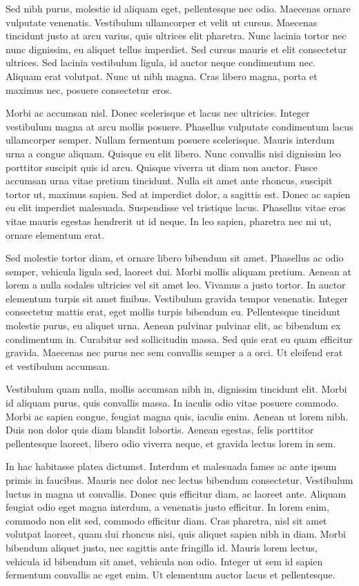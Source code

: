 Sed nibh purus, molestie id aliquam eget, pellentesque nec odio. Maecenas ornare vulputate venenatis. Vestibulum ullamcorper et velit ut cursus. Maecenas tincidunt justo at arcu varius, quis ultrices elit pharetra. Nunc lacinia tortor nec nunc dignissim, eu aliquet tellus imperdiet. Sed cursus mauris et elit consectetur ultrices. Sed lacinia vestibulum ligula, id auctor neque condimentum nec. Aliquam erat volutpat. Nunc ut nibh magna. Cras libero magna, porta et maximus nec, posuere consectetur eros.

Morbi ac accumsan nisl. Donec scelerisque et lacus nec ultricies. Integer vestibulum magna at arcu mollis posuere. Phasellus vulputate condimentum lacus ullamcorper semper. Nullam fermentum posuere scelerisque. Mauris interdum urna a congue aliquam. Quisque eu elit libero. Nunc convallis nisi dignissim leo porttitor suscipit quis id arcu. Quisque viverra ut diam non auctor. Fusce accumsan urna vitae pretium tincidunt. Nulla sit amet ante rhoncus, suscipit tortor ut, maximus sapien. Sed at imperdiet dolor, a sagittis est. Donec ac sapien eu elit imperdiet malesuada. Suspendisse vel tristique lacus. Phasellus vitae eros vitae mauris egestas hendrerit ut id neque. In leo sapien, pharetra nec mi ut, ornare elementum erat.

Sed molestie tortor diam, et ornare libero bibendum sit amet. Phasellus ac odio semper, vehicula ligula sed, laoreet dui. Morbi mollis aliquam pretium. Aenean at lorem a nulla sodales ultricies vel sit amet leo. Vivamus a justo tortor. In auctor elementum turpis sit amet finibus. Vestibulum gravida tempor venenatis. Integer consectetur mattis erat, eget mollis turpis bibendum eu. Pellentesque tincidunt molestie purus, eu aliquet urna. Aenean pulvinar pulvinar elit, ac bibendum ex condimentum in. Curabitur sed sollicitudin massa. Sed quis erat eu quam efficitur gravida. Maecenas nec purus nec sem convallis semper a a orci. Ut eleifend erat et vestibulum accumsan.

Vestibulum quam nulla, mollis accumsan nibh in, dignissim tincidunt elit. Morbi id aliquam purus, quis convallis massa. In iaculis odio vitae posuere commodo. Morbi ac sapien congue, feugiat magna quis, iaculis enim. Aenean ut lorem nibh. Duis non dolor quis diam blandit lobortis. Aenean egestas, felis porttitor pellentesque laoreet, libero odio viverra neque, et gravida lectus lorem in sem.

In hac habitasse platea dictumst. Interdum et malesuada fames ac ante ipsum primis in faucibus. Mauris nec dolor nec lectus bibendum consectetur. Vestibulum luctus in magna ut convallis. Donec quis efficitur diam, ac laoreet ante. Aliquam feugiat odio eget magna interdum, a venenatis justo efficitur. In lorem enim, commodo non elit sed, commodo efficitur diam. Cras pharetra, nisl sit amet volutpat laoreet, quam dui rhoncus nisi, quis aliquet sapien nibh in diam. Morbi bibendum aliquet justo, nec sagittis ante fringilla id. Mauris lorem lectus, vehicula id bibendum sit amet, vehicula non odio. Integer ut sem id sapien fermentum convallis ac eget enim. Ut elementum auctor lacus et pellentesque.

